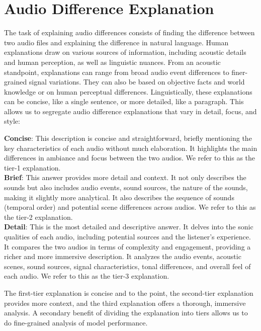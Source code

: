 \vspace{-0.1in}
\section{Audio Difference Explanation} \label{sec: audio difference task tiers} \vspace{-0.1in}
The task of explaining audio differences consists of finding the difference between two audio files and explaining the difference in natural language. Human explanations draw on various sources of information, including acoustic details and human perception, as well as linguistic nuances. From an acoustic standpoint, explanations can range from broad audio event differences to finer-grained signal variations. They can also be based on objective facts and world knowledge or on human perceptual differences. Linguistically, these explanations can be concise, like a single sentence, or more detailed, like a paragraph. This allows us to segregate audio difference explanations that vary in detail, focus, and style:

\noindent\textbf{Concise}: This description is concise and straightforward, briefly mentioning the key characteristics of each audio without much elaboration. It highlights the main differences in ambiance and focus between the two audios. We refer to this as the tier-1 explanation. \\
\textbf{Brief}: This answer provides more detail and context. It not only describes the sounds but also includes audio events, sound sources, the nature of the sounds, making it slightly more analytical. It also describes the sequence of sounds (temporal order) and potential scene differences across audios. We refer to this as the tier-2 explanation. \\
\textbf{Detail}: This is the most detailed and descriptive answer. It delves into the sonic qualities of each audio, including potential sources and the listener’s experience. It compares the two audios in terms of complexity and engagement, providing a richer and more immersive description. It analyzes the audio events, acoustic scenes, sound sources, signal characteristics, tonal differences, and overall feel of each audio. We refer to this as the tier-3 explanation. 

The first-tier explanation is concise and to the point, the second-tier explanation provides more context, and the third explanation offers a thorough, immersive analysis. A secondary benefit of dividing the explanation into tiers allows us to do fine-grained analysis of model performance. 

